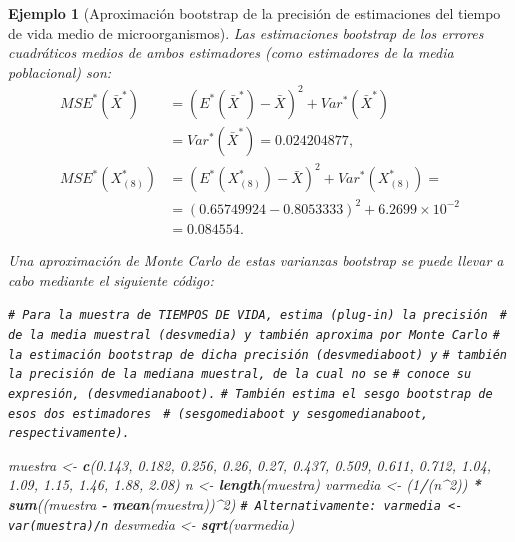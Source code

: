 \documentclass[
]{book}
\newenvironment{Shaded}{\begin{snugshade}}{\end{snugshade}}
\newcommand{\CommentTok}[1]{\textcolor[rgb]{0.56,0.35,0.01}{\textit{#1}}}
\newcommand{\DecValTok}[1]{\textcolor[rgb]{0.00,0.00,0.81}{#1}}
\newcommand{\FloatTok}[1]{\textcolor[rgb]{0.00,0.00,0.81}{#1}}
\newcommand{\FunctionTok}[1]{\textcolor[rgb]{0.13,0.29,0.53}{\textbf{#1}}}
\newcommand{\NormalTok}[1]{#1}
\newcommand{\OtherTok}[1]{\textcolor[rgb]{0.56,0.35,0.01}{#1}}
\newcommand{\SpecialCharTok}[1]{\textcolor[rgb]{0.81,0.36,0.00}{\textbf{#1}}}
\theoremstyle{break}
\newtheorem{example}{Ejemplo}[chapter]
\theoremstyle{nonumberplain}
\renewcommand{\CommentTok}[1]{\textcolor[rgb]{0.41,0.41,0.41}{\texttt{#1}}}
\begin{document}
\begin{example}[Aproximación bootstrap de la precisión de estimaciones del tiempo de vida medio de microorganismos]
Las estimaciones bootstrap de los errores cuadráticos medios de ambos
estimadores (como estimadores de la media poblacional) son:
\[\begin{aligned}
MSE^{\ast}\left( \bar{X}^{\ast} \right) &= \left( E^{\ast}\left( 
\bar{X}^{\ast} \right) -\bar{X} \right)^2+Var^{\ast}\left( 
\bar{X}^{\ast} \right) \\
&= Var^{\ast}\left( \bar{X}^{\ast} \right) =0.024204877, \\
MSE^{\ast}\left( X_{\left( 8 \right)}^{\ast} \right) &= \left( E^{\ast
}\left( X_{\left( 8 \right)}^{\ast} \right) -\bar{X} \right)
^2+Var^{\ast}\left( X_{\left( 8 \right)}^{\ast} \right) = \\
&= \left( 0.65749924-0.8053333 \right)^2+6.2699 \times 10^{-2}\\
&=  0.084554.
\end{aligned}\]

Una aproximación de Monte Carlo de estas varianzas bootstrap se puede
llevar a cabo mediante el siguiente código:

\begin{Shaded}
\begin{Highlighting}[]
\CommentTok{\# Para la muestra de TIEMPOS DE VIDA, estima (plug{-}in) la precisión }
\CommentTok{\# de la media muestral (desvmedia) y también aproxima por Monte Carlo}
\CommentTok{\# la estimación bootstrap de dicha precisión (desvmediaboot) y}
\CommentTok{\# también la precisión de la mediana muestral, de la cual no se}
\CommentTok{\# conoce su expresión, (desvmedianaboot).}
\CommentTok{\# También estima el sesgo bootstrap de esos dos estimadores }
\CommentTok{\# (sesgomediaboot y sesgomedianaboot, respectivamente).}

\NormalTok{muestra }\OtherTok{\textless{}{-}} \FunctionTok{c}\NormalTok{(}\FloatTok{0.143}\NormalTok{, }\FloatTok{0.182}\NormalTok{, }\FloatTok{0.256}\NormalTok{, }\FloatTok{0.26}\NormalTok{, }\FloatTok{0.27}\NormalTok{, }\FloatTok{0.437}\NormalTok{, }\FloatTok{0.509}\NormalTok{,}
    \FloatTok{0.611}\NormalTok{, }\FloatTok{0.712}\NormalTok{, }\FloatTok{1.04}\NormalTok{, }\FloatTok{1.09}\NormalTok{, }\FloatTok{1.15}\NormalTok{, }\FloatTok{1.46}\NormalTok{, }\FloatTok{1.88}\NormalTok{, }\FloatTok{2.08}\NormalTok{)}
\NormalTok{n }\OtherTok{\textless{}{-}} \FunctionTok{length}\NormalTok{(muestra)}
\NormalTok{varmedia }\OtherTok{\textless{}{-}}\NormalTok{ (}\DecValTok{1}\SpecialCharTok{/}\NormalTok{(n}\SpecialCharTok{\^{}}\DecValTok{2}\NormalTok{)) }\SpecialCharTok{*} \FunctionTok{sum}\NormalTok{((muestra }\SpecialCharTok{{-}} \FunctionTok{mean}\NormalTok{(muestra))}\SpecialCharTok{\^{}}\DecValTok{2}\NormalTok{)}
\CommentTok{\# Alternativamente: varmedia \textless{}{-} var(muestra)/n}
\NormalTok{desvmedia }\OtherTok{\textless{}{-}} \FunctionTok{sqrt}\NormalTok{(varmedia)}


\end{Highlighting}
\end{Shaded}
\end{example}
\end{document}
